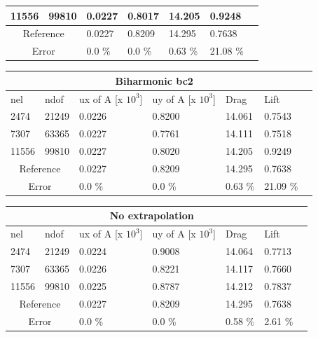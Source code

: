 \begin{table}[h!]
\begin{tabular}{ |p{1cm}||p{1cm}|p{2.5cm}|p{2.5cm}|p{2.7cm}|p{2.7cm}|p{1.2cm}|}
 11556   & 99810  &       0.0227  &       0.8017 & 14.205 & 0.9248 \\
  \hline
 \multicolumn{2}{|c|}{Reference} &  0.0227      &       0.8209      & 14.295  & 0.7638   \\
 \hline
    \multicolumn{2}{|c|}{Error}  & 0.0 \% & 0.0 \% & 0.63 \% & 21.08 \% \\
 \hline
\end{tabular}
\begin{tabular}{ |p{1cm}||p{1cm}|p{2.5cm}|p{2.5cm}|p{2.7cm}|p{2.7cm}|p{1.2cm}|}
 \hline
  \multicolumn{6}{|c|}{Biharmonic bc2} \\
   \hline
nel & ndof & ux of A [x $10^{3}$]  &uy of A [x $10^{3}$]& Drag  & Lift \\
 \hline
 2474    & 21249  &       0.0226 &       0.8200 & 14.061 & 0.7543 \\
 7307    & 63365  &       0.0227 &       0.7761 & 14.111 & 0.7518 \\
 11556   & 99810  &       0.0227 &       0.8020 & 14.205 & 0.9249  \\
  \hline
 \multicolumn{2}{|c|}{Reference} &  0.0227      &       0.8209      & 14.295  & 0.7638   \\
 \hline
    \multicolumn{2}{|c|}{Error}  & 0.0 \% & 0.0 \% & 0.63 \% & 21.09 \% \\
 \hline
\end{tabular}

\begin{tabular}{ |p{1cm}||p{1cm}|p{2.5cm}|p{2.5cm}|p{2.7cm}|p{2.7cm}|p{1.2cm}|}
 \hline
  \multicolumn{6}{|c|}{No extrapolation} \\
   \hline
nel & ndof & ux of A [x $10^{3}$]  &uy of A [x $10^{3}$]& Drag  & Lift \\
 \hline
 2474    & 21249  &       0.0224 &       0.9008 & 14.064 & 0.7713 \\
 7307    & 63365  &       0.0226  &       0.8221 & 14.117 & 0.7660 \\
 11556   & 99810  &       0.0225 &       0.8787 & 14.212 & 0.7837 \\
   \hline
 \multicolumn{2}{|c|}{Reference} &  0.0227      &       0.8209      & 14.295  & 0.7638   \\
 \hline
    \multicolumn{2}{|c|}{Error}  &  0.0 \% & 0.0 \% & 0.58 \% & 2.61 \%  \\
 \hline
\end{tabular}

\end{table}

